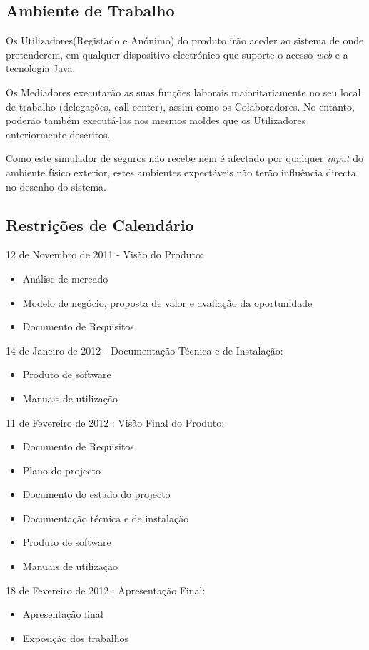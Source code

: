 \subsection{Ambiente de Trabalho}
Os Utilizadores(Registado e Anónimo) do produto irão aceder ao sistema de onde pretenderem, em qualquer dispositivo electrónico que suporte o acesso \emph{web} e a tecnologia Java.

Os Mediadores executarão as suas funções laborais maioritariamente no seu local de trabalho (delegações, call-center), assim como os Colaboradores. No entanto, poderão também executá-las nos mesmos moldes que os Utilizadores anteriormente descritos.

Como este simulador de seguros não recebe nem é afectado por qualquer \emph{input} do ambiente físico exterior, estes ambientes expectáveis não terão influência directa no desenho do sistema.

\subsection{Restrições de Calendário}
\begin{description}
    \item 12 de Novembro de 2011 - Visão do Produto: 
        \begin{itemize}
            \item Análise de mercado
            \item Modelo de negócio, proposta de valor e avaliação da oportunidade
            \item Documento de Requisitos
        \end{itemize}
    \item 14 de Janeiro de 2012 - Documentação Técnica e de Instalação: 
        \begin{itemize}
            \item Produto de software
            \item Manuais de utilização
        \end{itemize}
    \item 11 de Fevereiro de 2012 : Visão Final do Produto:
        \begin{itemize}
            \item Documento de Requisitos
            \item Plano do projecto
            \item Documento do estado do projecto
            \item Documentação técnica e de instalação
            \item Produto de software
            \item Manuais de utilização
        \end{itemize}
    \item 18 de Fevereiro de 2012 : Apresentação Final: 
        \begin{itemize}
            \item Apresentação final
            \item Exposição dos trabalhos
        \end{itemize}
\end{description}

